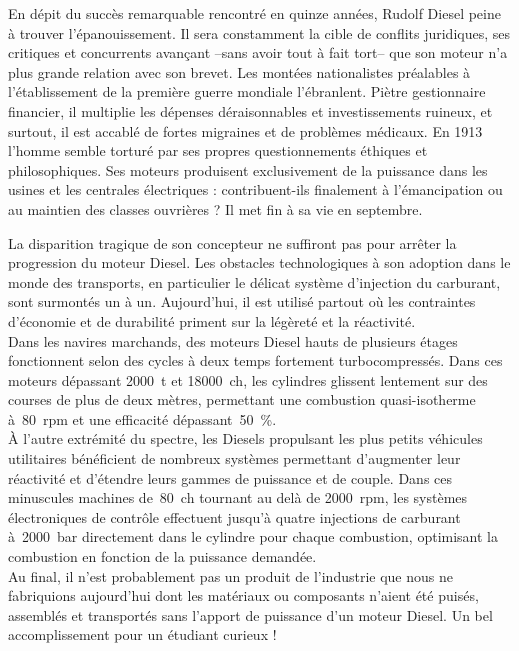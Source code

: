 	En dépit du succès remarquable rencontré en quinze années, Rudolf Diesel peine à trouver l’épanouissement. Il sera constamment la cible de conflits juridiques, ses critiques et concurrents avançant --sans avoir tout à fait tort-- que son moteur n’a plus grande relation avec son brevet. Les montées nationalistes préalables à l’établissement de la première guerre mondiale l’ébranlent. Piètre gestionnaire financier, il multiplie les dépenses déraisonnables et investissements ruineux, et surtout, il est accablé de fortes migraines et de problèmes médicaux. En 1913 l’homme semble torturé par ses propres questionnements éthiques et philosophiques. Ses moteurs produisent exclusivement de la puissance dans les usines et les centrales électriques : contribuent-ils finalement à l’émancipation ou  au maintien des classes ouvrières ? Il met fin à sa vie en septembre.
	
	La disparition tragique de son concepteur ne suffiront pas pour arrêter la progression du moteur Diesel. Les obstacles technologiques à son adoption dans le monde des transports, en particulier le délicat système d’injection du carburant, sont surmontés un à un. Aujourd’hui, il est utilisé partout où les contraintes d’économie et de durabilité priment sur la légèreté et la réactivité.\\
	Dans les navires marchands, des moteurs Diesel hauts de plusieurs étages fonctionnent selon des cycles à deux temps fortement turbocompressés. Dans ces moteurs dépassant \SI{2000}{\tonne} et \SI{18 000}{ch}, %
	les cylindres glissent lentement sur des courses de plus de deux mètres, permettant une combustion quasi-isotherme à~\SI{80}{rpm} et une efficacité dépassant~\SI{50}{\percent}.\\
	À l’autre extrémité du spectre, les Diesels propulsant les plus petits véhicules utilitaires bénéficient de nombreux systèmes permettant d’augmenter leur réactivité et d’étendre leurs gammes de puissance et de couple. Dans ces minuscules machines de~\SI{80}{ch} tournant au delà de \SI{2000}{rpm}, les systèmes électroniques de contrôle effectuent jusqu’à quatre injections de carburant à~\SI{2000}{\bar} directement dans le cylindre pour chaque combustion, optimisant la combustion en fonction de la puissance demandée.\\
	Au final, il n’est probablement pas un produit de l’industrie que nous ne fabriquions aujourd’hui dont les matériaux ou composants n’aient été puisés, assemblés et transportés sans l’apport de puissance d’un moteur Diesel. Un bel accomplissement pour un étudiant curieux !
	
\atendofhistorysection
